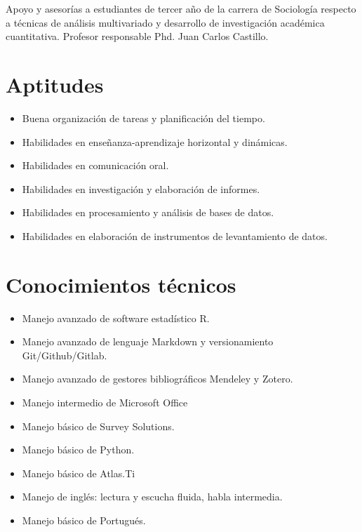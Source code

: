 \documentclass[11pt,a4paper,]{awesome-cv}
\providecommand{\tightlist}{%
	\setlength{\itemsep}{0pt}\setlength{\parskip}{0pt}}
\begin{document}
\begin{cventries}
{\begin{cvitems}
\item Apoyo y asesorías a estudiantes de tercer año de la carrera de Sociología respecto a técnicas de análisis multivariado y desarrollo de investigación académica cuantitativa. Profesor responsable Phd. Juan Carlos Castillo.
\end{cvitems}}
\end{cventries}

\hypertarget{aptitudes}{%
\section{Aptitudes}\label{aptitudes}}

\begin{itemize}
\tightlist
\item
  Buena organización de tareas y planificación del tiempo.
\item
  Habilidades en enseñanza-aprendizaje horizontal y dinámicas.
\item
  Habilidades en comunicación oral.
\item
  Habilidades en investigación y elaboración de informes.
\item
  Habilidades en procesamiento y análisis de bases de datos.
\item
  Habilidades en elaboración de instrumentos de levantamiento de datos.
\end{itemize}

\hypertarget{conocimientos-tuxe9cnicos}{%
\section{Conocimientos técnicos}\label{conocimientos-tuxe9cnicos}}

\begin{itemize}
\tightlist
\item
  Manejo avanzado de software estadístico R.
\item
  Manejo avanzado de lenguaje Markdown y versionamiento
  Git/Github/Gitlab.
\item
  Manejo avanzado de gestores bibliográficos Mendeley y Zotero.
\item
  Manejo intermedio de Microsoft Office
\item
  Manejo básico de Survey Solutions.
\item
  Manejo básico de Python.
\item
  Manejo básico de Atlas.Ti
\item
  Manejo de inglés: lectura y escucha fluida, habla intermedia.
\item
  Manejo básico de Portugués.
\end{itemize}
\end{document}
